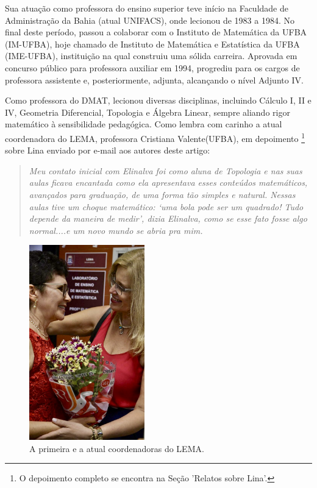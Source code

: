 \documentclass{hipatia}
\begin{document}
Sua atuação como professora do ensino superior teve início na Faculdade de Administração da Bahia (atual UNIFACS), onde lecionou de 1983 a 1984. No final deste período, passou a colaborar com o Instituto de Matemática da UFBA (IM-UFBA), hoje chamado de Instituto de Matemática e Estatística da UFBA (IME-UFBA), instituição na qual construiu uma sólida carreira. Aprovada em concurso público para professora auxiliar em 1994, progrediu para os cargos de professora assistente e, posteriormente, adjunta, alcançando o nível Adjunto IV.  

Como professora do DMAT, lecionou diversas disciplinas, incluindo Cálculo I, II e IV, Geometria Diferencial, Topologia e Álgebra Linear, sempre aliando rigor matemático à sensibilidade pedagógica. Como lembra com carinho a atual coordenadora do LEMA, professora Cristiana Valente(UFBA), em depoimento \footnote{O depoimento completo se encontra na Seção 'Relatos sobre Lina'.} sobre Lina enviado por e-mail aos autores deste artigo: \begin{quote}\textit{Meu contato inicial com Elinalva foi como aluna de Topologia e nas suas aulas ficava encantada como ela apresentava esses conteúdos matemáticos, avançados para graduação, de uma forma tão simples e natural. Nessas aulas tive um choque matemático: ‘uma bola pode ser um quadrado! Tudo depende da maneira de medir’, dizia Elinalva, como se esse fato fosse algo normal....e um novo mundo se abria pra mim.}\end{quote}  
    

\begin{figure}[htb!]
\hspace{2cm}\includegraphics[width=5cm]{Cris.jpg}
\caption{A primeira e a atual coordenadoras do LEMA.}   
\end{figure}
\end{document}

